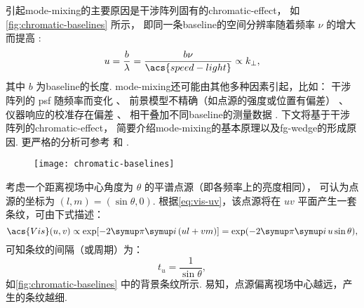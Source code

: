 引起\ac{mode-mixing}的主要原因是干涉阵列固有的\ac{chromatic-effect}，
如\autoref{fig:chromatic-baselines} 所示，
即同一条\ac{baseline}的空间分辨率随着频率 $\nu$ 的增大而提高 \cite{liu2014}:
\begin{equation}
  \label{eq:baseline-u-nu}
  u = \frac{b}{\lambda}
    = \frac{b \nu}{\acs{speed-light}}
    \propto \kperp ,
\end{equation}
其中 $b$ 为\ac{baseline}的长度.
\ac{mode-mixing}还可能由其他多种因素引起，比如：
干涉阵列的 \ac{psf} 随频率而变化 \cite{bowman2009,liu2009ps}、
前景模型不精确（如点源的强度或位置有偏差） \cite{datta2010,morales2012}、
仪器响应的校准存在偏差 \cite{morales2012}、
相干叠加不同\ac{baseline}的测量数据 \cite{hazelton2013}.
下文将基于干涉阵列的\ac{chromatic-effect}，
简要介绍\ac{mode-mixing}的基本原理以及\ac{fg-wedge}的形成原因.
更严格的分析可参考  和 .

\begin{figure}[htp]
  \centering
  \texttt{[image: chromatic-baselines]}
  \label{fig:chromatic-baselines}
\end{figure}

考虑一个距离视场中心角度为 $\theta$ 的平谱点源（即各频率上的亮度相同），
可认为点源的坐标为 $(l, m) = (\sin\theta, 0)$.
根据\autoref{eq:vis-uv}，该点源将在 $uv$ 平面产生一套条纹，可由下式描述：
\begin{equation}
  \acs{Vis}(u,v) \propto \exp [-2\Cpi\Ci\, (ul+vm)]
    = \exp (-2\Cpi\Ci\, u \sin\theta) ,
\end{equation}
可知条纹的间隔（或周期）为：
\begin{equation}
  \label{eq:ps-t-u}
  t_u = \frac{1}{\sin\theta} ,
\end{equation}
如\autoref{fig:chromatic-baselines} 中的背景条纹所示.
易知，点源偏离视场中心越远，产生的条纹越细.


